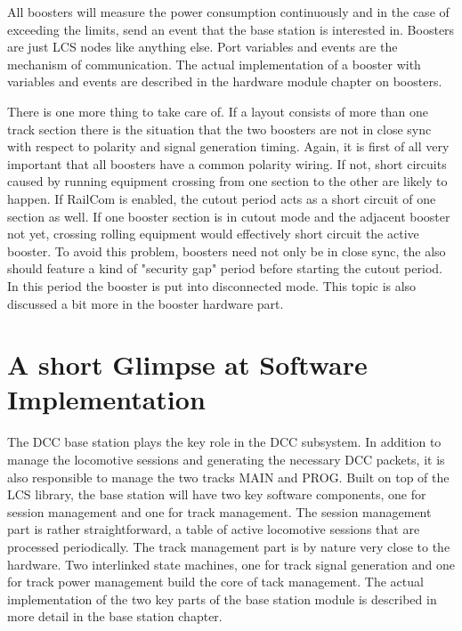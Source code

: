 \begin{center}
\end{center}

    
All boosters will measure the power consumption continuously and in the case of exceeding the limits, send an event that the base station is interested in. Boosters are just LCS nodes like anything else. Port variables and events are the mechanism of communication. The actual implementation of a booster with variables and events are described in the hardware module chapter on boosters.

There is one more thing to take care of. If a layout consists of more than one track section there is the situation that the two boosters are not in close sync with respect to polarity and signal generation timing. Again, it is first of all very important that all boosters have a common polarity wiring. If not, short circuits caused by running equipment crossing from one section to the other are likely to happen. If RailCom is enabled, the cutout period acts as a short circuit of one section as well. If one booster section is in cutout mode and the adjacent booster not yet, crossing rolling equipment would effectively short circuit the active booster. To avoid this problem, boosters need not only be in close sync, the also should feature a kind of "security gap" period before starting the cutout period. In this period the booster is put into disconnected mode. This topic is also discussed a bit more in the booster hardware part.

\section{A short Glimpse at Software Implementation}

The DCC base station plays the key role in the DCC subsystem. In addition to manage the locomotive sessions and generating the necessary DCC packets, it is also responsible to manage the two tracks MAIN and PROG. Built on top of the LCS library, the base station will have two key software components, one for session management and one for track management. The session management part is rather straightforward, a table of active locomotive sessions that are processed periodically. The track management part is by nature very close to the hardware. Two interlinked state machines, one for track signal generation and one for track power management build the core of tack management. The actual implementation of the two key parts of the base station module is described in more detail in the base station chapter.

